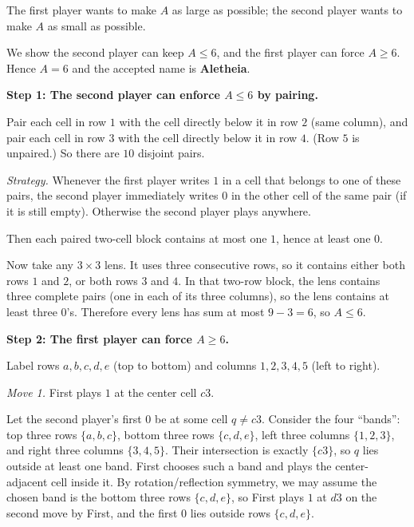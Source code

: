 The first player wants to make $A$ as large as possible; the second player wants to make $A$ as small as possible.


\SolutionPage
\footnotesize

We show the second player can keep $A\le 6$, and the first player can force $A\ge 6$.
Hence $A=6$ and the accepted name is \textbf{Aletheia}.

\medskip
\textbf{Step 1: The second player can enforce $A\le 6$ by pairing.}

Pair each cell in row $1$ with the cell directly below it in row $2$ (same column),
and pair each cell in row $3$ with the cell directly below it in row $4$.
(Row $5$ is unpaired.)
So there are $10$ disjoint pairs.

\smallskip
\noindent\emph{Strategy.}
Whenever the first player writes $1$ in a cell that belongs to one of these pairs,
the second player immediately writes $0$ in the other cell of the same pair (if it is still empty).
Otherwise the second player plays anywhere.

Then each paired two-cell block contains at most one $1$, hence at least one $0$.

Now take any $3\times3$ lens. It uses three consecutive rows, so it contains either both rows $1$ and $2$,
or both rows $3$ and $4$.
In that two-row block, the lens contains three complete pairs (one in each of its three columns),
so the lens contains at least three $0$'s.
Therefore every lens has sum at most $9-3=6$, so $A\le 6$.

\medskip
\textbf{Step 2: The first player can force $A\ge 6$.}

Label rows $a,b,c,d,e$ (top to bottom) and columns $1,2,3,4,5$ (left to right).

\smallskip
\emph{Move 1.} First plays $1$ at the center cell $c3$.

Let the second player's first $0$ be at some cell $q\ne c3$.
Consider the four ``bands'': top three rows $\{a,b,c\}$, bottom three rows $\{c,d,e\}$,
left three columns $\{1,2,3\}$, and right three columns $\{3,4,5\}$.
Their intersection is exactly $\{c3\}$, so $q$ lies outside at least one band.
First chooses such a band and plays the center-adjacent cell inside it.
By rotation/reflection symmetry, we may assume the chosen band is the bottom three rows $\{c,d,e\}$,
so First plays $1$ at $d3$ on the second move by First, and the first $0$ lies outside rows $\{c,d,e\}$.

